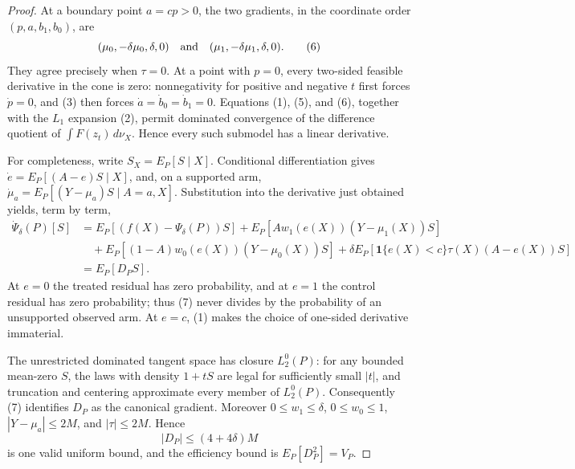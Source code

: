\documentclass{article}
\begin{document}
\begin{proof}
At a boundary point \(a=cp>0\), the two gradients, in the coordinate order \((p,a,b_1,b_0)\), are
\begin{equation}
 (\mu _0,-\delta\mu _0,\delta,0)\quad\hbox{and}\quad
 (\mu _1,-\delta\mu _1,\delta,0).                                                       \tag{6}
\end{equation}
They agree precisely when \(\tau=0\).  At a point with \(p=0\), every two-sided feasible derivative in the cone is zero: nonnegativity for positive and negative \(t\) first forces \(\dot p=0\), and (3) then forces \(\dot a=\dot b_0=\dot b_1=0\).  Equations (1), (5), and (6), together with the \(L_1\) expansion (2), permit dominated convergence of the difference quotient of \(\int F(z_t)\,d\nu_X\).  Hence every such submodel has a linear derivative.

For completeness, write \(S_X=E_P[S\mid X]\).  Conditional differentiation gives
\(\dot e=E_P[(A-e)S\mid X]\), and, on a supported arm,
\(\dot\mu_a=E_P[(Y-\mu_a)S\mid A=a,X]\).  Substitution into the derivative just obtained yields, term by term,
\begin{equation}
\begin{aligned}
 \dot\Psi_\delta(P)[S]
 &=E_P[(f(X)-\Psi_\delta(P))S]
   +E_P\!\left[Aw_1(e(X))(Y-\mu _1(X))S\right]\\
 &\quad+E_P\!\left[(1-A)w_0(e(X))(Y-\mu _0(X))S\right]
   +\delta E_P\!\left[\mathbf1\{e(X)<c\}\tau(X)(A-e(X))S\right]\\
 &=E_P[D_P S].
\end{aligned}                                                                             \tag{7}
\end{equation}
At \(e=0\) the treated residual has zero probability, and at \(e=1\) the control residual has zero probability; thus (7) never divides by the probability of an unsupported observed arm.  At \(e=c\), (1) makes the choice of one-sided derivative immaterial.

The unrestricted dominated tangent space has closure \(L_2^0(P)\): for any bounded mean-zero \(S\), the laws with density \(1+tS\) are legal for sufficiently small \(|t|\), and truncation and centering approximate every member of \(L_2^0(P)\).  Consequently (7) identifies \(D_P\) as the canonical gradient.  Moreover \(0\le w_1\le\delta\), \(0\le w_0\le1\), \(|Y-\mu_a|\le2M\), and \(|\tau|\le2M\).  Hence
\begin{equation}
 |D_P|\le (4+4\delta)M                                                                    \tag{8}
\end{equation}
is one valid uniform bound, and the efficiency bound is \(E_P[D_P^2]=V_P\).


\end{proof}
\end{document}
